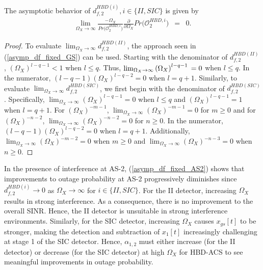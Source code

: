 \begin{corollary}
The asymptotic behavior of $d_{f,2}^{HBD(i)}, i \in \{II,SIC\}$ is given by
\begin{eqnarray} \label{asymp_df_fixed_AS2}
\lim_{\Omega_X\to\infty} \frac{-\Omega_X}{Pr\big(\mathcal{O}_{2}^{HBD,i}\big)}\frac{\partial}{\partial\Omega_X}Pr\big(\mathcal{O}_{2}^{HBD,i}\big) & = & 0.
\end{eqnarray}
\end{corollary}
\begin{proof}
To evaluate $\lim_{\Omega_X\to\infty} d_{f,2}^{HBD(II)}$, the approach seen in (\ref{asymp_df_fixed_GS}) can be used. Starting with the denominator of $d_{f,2}^{HBD(II)}$, $\left(\Omega_X\right)^{l-q-1} < 1$ when $l \leq q$. Thus, $\lim_{\Omega_X\to\infty} \left(\Omega_X\right)^{l-q-1} \\ = 0$ when $l \leq q$. In the numerator, $(l-q-1) \left(\Omega_X\right)^{l-q-2} = 0$ when $l=q+1$. Similarly, to evaluate $\lim_{\Omega_X\to\infty} d_{f,2}^{HBD(SIC)}$, we first begin with the denominator of $d_{f,2}^{HBD(SIC)}$. Specifically, $\lim_{\Omega_X\to\infty}(\Omega_X)^{l-q-1}=0 $ when $l\leq{q}$ and $(\Omega_X)^{l-q-1}=1$ when $l=q+1$. For $(\Omega_X)^{-m-1}$, $\lim_{\Omega_X\to\infty}(\Omega_X)^{-m-1}=0 $ for $m\geq0$ and for $(\Omega_X)^{-n-2}$, $\lim_{\Omega_X\to\infty}(\Omega_X)^{-n-2}=0 $ for $n\geq0$. In the numerator, $(l-q-1) \left(\Omega_X\right)^{l-q-2} = 0$ when $l=q+1$. Additionally, $\lim_{\Omega_X\to\infty} (\Omega_X)^{-m-2}=0$ when $m\geq0$ and $\lim_{\Omega_X\to\infty} (\Omega_X)^{-n-3}=0$ when $n\geq0$.
\end{proof}


In the presence of interference at AS-2, (\ref{asymp_df_fixed_AS2}) shows that improvements to outage probability at AS-2 progressively diminishes since $d_{f,2}^{HBD(i)} \to 0$ as $\Omega_X \to \infty$ for $i \in \{II,SIC\}$. For the II detector, increasing $\Omega_X$ results in strong interference. As a consequence, there is no improvement to the overall SINR. Hence, the II detector is unsuitable in strong interference environments. Similarly, for the SIC detector, increasing $\Omega_X$ causes $x_{gs}[t]$ to be stronger, making the detection and subtraction of $x_1[t]$ increasingly challenging at stage 1 of the SIC detector. Hence, $\alpha_{1,2}$ must either increase (for the II detector) or decrease (for the SIC detector) at high $\Omega_X$ for HBD-ACS to see meaningful improvements in outage probability.

